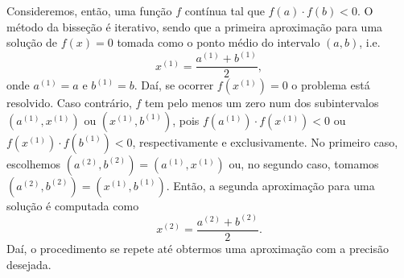 Consideremos, então, uma função $f$ contínua tal que $f(a)\cdot f(b) < 0$. O método da bisseção é iterativo, sendo que a primeira aproximação para uma solução de $f(x)=0$ tomada como o ponto médio do intervalo $(a, b)$, i.e.
\begin{equation}
  x^{(1)} = \frac{a^{(1)}+b^{(1)}}{2},
\end{equation}
onde $a^{(1)} = a$ e $b^{(1)} = b$. Daí, se ocorrer $f(x^{(1)})=0$ o problema está resolvido. Caso contrário, $f$ tem pelo menos um zero num dos subintervalos $(a^{(1)}, x^{(1)})$ ou $(x^{(1)}, b^{(1)})$, pois $f(a^{(1)})\cdot f(x^{(1)}) < 0$ ou  $f(x^{(1)})\cdot f(b^{(1)}) < 0$, respectivamente e exclusivamente. No primeiro caso, escolhemos $(a^{(2)}, b^{(2)}) = (a^{(1)}, x^{(1)})$ ou, no segundo caso, tomamos $(a^{(2)}, b^{(2)}) = (x^{(1)}, b^{(1)})$. Então, a segunda aproximação para uma solução é computada como
\begin{equation}
  x^{(2)} = \frac{a^{(2)} + b^{(2)}}{2}.
\end{equation}
Daí, o procedimento se repete até obtermos uma aproximação com a precisão desejada.

